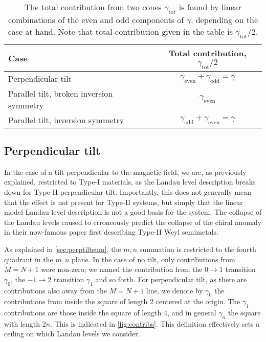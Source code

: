 \begin{table}[h]
  \centering
  \begin{tabular}{l c}
    \toprule
    Case & Total contribution, \( \gamma_{\text{tot}} /2 \)\\
    \midrule
    Perpendicular tilt & \( \gamma_{\text{even}} + \gamma_{\text{odd}} = \gamma \)\\
    Parallel tilt, broken inversion symmetry & \( \gamma_{\text{even}} \)\\
    Parallel tilt, inversion symmetry &  \(  \gamma_{\text{odd}} + \gamma_{\text{even}} = \gamma \)\\\bottomrule
  \end{tabular}
  \caption{The total contribution from two cones \( \gamma_{\text{tot}} \) is found by linear combinations of the even and odd components of \( \gamma \), depending on the case at hand.
    Note that total contribution given in the table is \( \gamma_{\text{tot}} /2 \).
    \label{tab:gamma-tot}}
\end{table}

\subsection{Perpendicular tilt}
In the case of a tilt perpendicular to the magnetic field, we are, as previously explained, restricted to Type-I materials, as the Landau level description breaks down for Type-II perpendicular tilt.
Importantly, this does not generally mean that the effect is not present for Type-II systems, but simply that the linear model Landau level description is not a good basis for the system.
The collapse of the Landau levels caused \textcite{soluyanovTypeIIWeylSemimetals2015} to erroneously predict the collapse of the chiral anomaly in their now-famous paper first describing Type-II Weyl semimetals.

As explained in \cref{sec:perptiltsum}, the \( m,n \) summation is restricted to the fourth quadrant in the \( m,n \) plane.
In the case of no tilt, only contributions from \( M = N + 1 \) were non-zero;
we named the contribution from the \( 0\to 1 \) transition \( \gamma_0 \), the \( -1\to 2 \) transition \( \gamma_1 \) and so forth.
For perpendicular tilt, as there are contributions also away from the \( M=N + 1 \) line, we denote by \( \gamma_0 \) the contributions from inside the square of length 2 centered at the origin.
The \( \gamma_1 \) contributions are those inside the square of length 4, and in general \( \gamma_n \) the square with length \( 2 n \).
This is indicated in \cref{fig:contribs}.
This definition effectively sets a ceiling on which Landau levels we consider.

